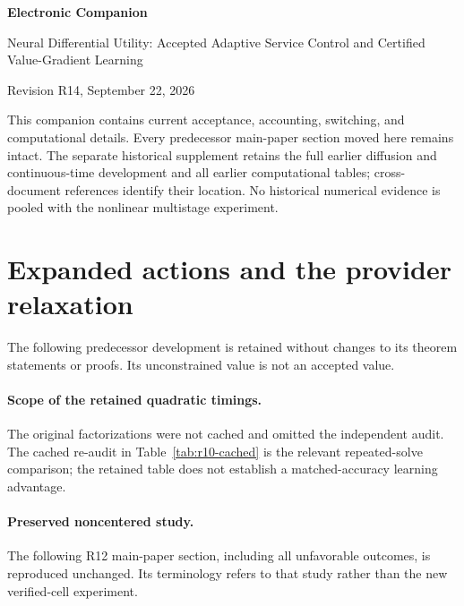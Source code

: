 \documentclass[11pt,letterpaper]{article}
\theoremstyle{definition}
\newcommand{\1}{\mathbf 1}
\begin{document}
\begin{center}{\Large\bfseries Electronic Companion\par}\medskip
{\large Neural Differential Utility: Accepted Adaptive Service Control and Certified Value-Gradient Learning\par}\medskip
Revision R14, September 22, 2026
\end{center}
This companion contains current acceptance, accounting, switching, and computational details. Every predecessor main-paper section moved here remains intact. The separate historical supplement retains the full earlier diffusion and continuous-time development and all earlier computational tables; cross-document references identify their location. No historical numerical evidence is pooled with the nonlinear multistage experiment.









\section{Expanded actions and the provider relaxation}\label{ec:r12-provider}
The following predecessor development is retained without changes to its theorem statements or proofs. Its unconstrained value is not an accepted value.




\paragraph{Scope of the retained quadratic timings.}
The original factorizations were not cached and omitted the independent audit. The cached re-audit in Table~\ref{tab:r10-cached} is the relevant repeated-solve comparison; the retained table does not establish a matched-accuracy learning advantage.

\paragraph{Preserved noncentered study.} The following R12 main-paper section, including all unfavorable outcomes, is reproduced unchanged. Its terminology refers to that study rather than the new verified-cell experiment.







\clearpage
\end{document}
